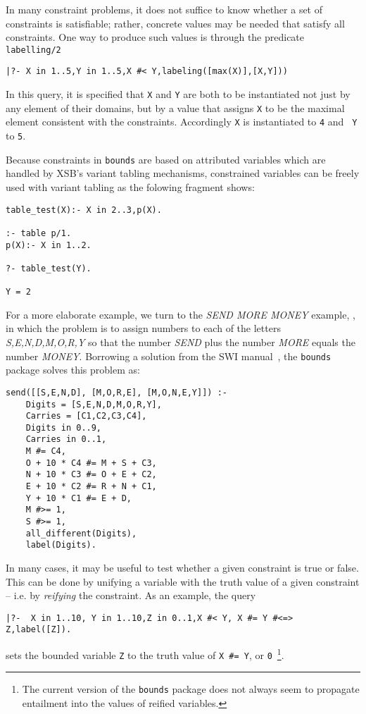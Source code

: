 In many constraint problems, it does not suffice to know whether a set
of constraints is satisfiable; rather, concrete values may be needed
that satisfy all constraints.  One way to produce such values is
through the predicate {\tt labelling/2}
%
{\small
\begin{verbatim}
|?- X in 1..5,Y in 1..5,X #< Y,labeling([max(X)],[X,Y]))
\end{verbatim}
}
%
\noindent
In this query, it is specified that {\tt X} and {\tt Y} are both to be
instantiated not just by any element of their domains, but by a value
that assigns {\tt X} to be the maximal element consistent with the
constraints.  Accordingly {\tt X} is instantiated to {\tt 4} and {\tt
  Y} to {\tt 5}.

Because constraints in {\tt bounds} are based on attributed variables
which are handled by XSB's variant tabling mechanisms, constrained
variables can be freely used with variant tabling as the folowing
fragment shows:
%
{\small
\begin{verbatim}
table_test(X):- X in 2..3,p(X).

:- table p/1.
p(X):- X in 1..2.

?- table_test(Y).

Y = 2
\end{verbatim}
}
%

For a more elaborate example, we turn to the {\em SEND MORE MONEY}
example, , in which the problem is to assign numbers to each of the
letters {\em S,E,N,D,M,O,R,Y} so that the number {\em SEND} plus the
number {\em MORE} equals the number {\em MONEY}.  Borrowing a solution
from the SWI manual~\cite{SWI-manual}, the {\tt bounds} package solves
this problem as:
%
{\small
\begin{verbatim}
send([[S,E,N,D], [M,O,R,E], [M,O,N,E,Y]]) :-
    Digits = [S,E,N,D,M,O,R,Y],
    Carries = [C1,C2,C3,C4],
    Digits in 0..9,
    Carries in 0..1,
    M #= C4,
    O + 10 * C4 #= M + S + C3,
    N + 10 * C3 #= O + E + C2,
    E + 10 * C2 #= R + N + C1,
    Y + 10 * C1 #= E + D,
    M #>= 1,
    S #>= 1,
    all_different(Digits),
    label(Digits).
\end{verbatim}
}

In many cases, it may be useful to test whether a given constraint is
true or false.  This can be done by unifying a variable with the truth
value of a given constraint -- i.e.  by {\em reifying} the constraint.
As an example, the query
%
{\small
\begin{verbatim}
|?-  X in 1..10, Y in 1..10,Z in 0..1,X #< Y, X #= Y #<=> Z,label([Z]).
\end{verbatim}
}
%
\noindent
sets the bounded variable {\tt Z} to the truth value of {\tt X \#= Y},
or {\tt 0}~\footnote{The current version of the {\tt bounds} package
  does not always seem to propagate entailment into the values of
  reified variables.}.

